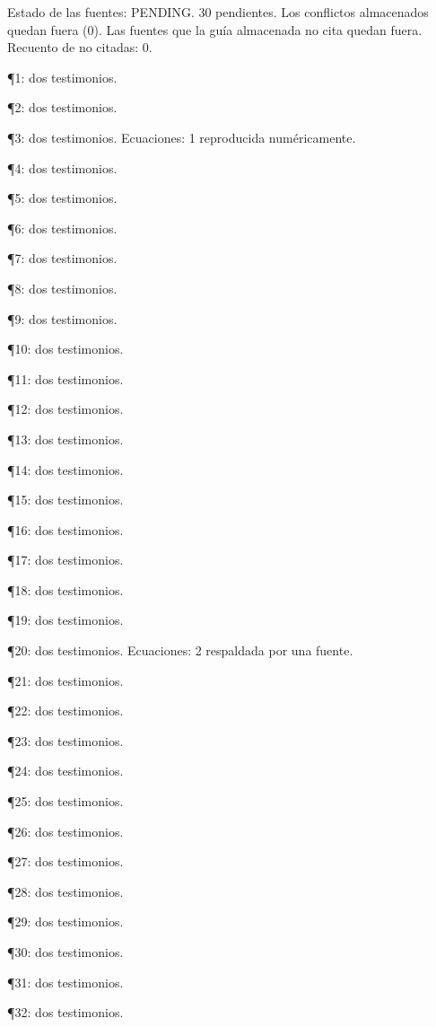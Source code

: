 \documentclass{book}
\begin{document}
\noindent Estado de las fuentes: PENDING. 30 pendientes. Los conflictos almacenados quedan fuera (0). Las fuentes que la guía almacenada no cita quedan fuera. Recuento de no citadas: 0.

\noindent ¶1: dos testimonios.

\noindent ¶2: dos testimonios.

\noindent ¶3: dos testimonios. Ecuaciones: 1 reproducida numéricamente.

\noindent ¶4: dos testimonios.

\noindent ¶5: dos testimonios.

\noindent ¶6: dos testimonios.

\noindent ¶7: dos testimonios.

\noindent ¶8: dos testimonios.

\noindent ¶9: dos testimonios.

\noindent ¶10: dos testimonios.

\noindent ¶11: dos testimonios.

\noindent ¶12: dos testimonios.

\noindent ¶13: dos testimonios.

\noindent ¶14: dos testimonios.

\noindent ¶15: dos testimonios.

\noindent ¶16: dos testimonios.

\noindent ¶17: dos testimonios.

\noindent ¶18: dos testimonios.

\noindent ¶19: dos testimonios.

\noindent ¶20: dos testimonios. Ecuaciones: 2 respaldada por una fuente.

\noindent ¶21: dos testimonios.

\noindent ¶22: dos testimonios.

\noindent ¶23: dos testimonios.

\noindent ¶24: dos testimonios.

\noindent ¶25: dos testimonios.

\noindent ¶26: dos testimonios.

\noindent ¶27: dos testimonios.

\noindent ¶28: dos testimonios.

\noindent ¶29: dos testimonios.

\noindent ¶30: dos testimonios.

\noindent ¶31: dos testimonios.

\noindent ¶32: dos testimonios.
\end{document}
